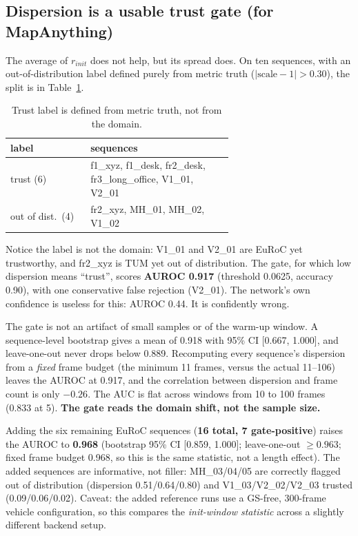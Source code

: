\subsection{Dispersion is a usable trust gate (for MapAnything)}
\label{sec:gate}

The average of $r_{init}$ does not help, but its spread does. On ten sequences,
with an out-of-distribution label defined purely from metric truth
($|\mathrm{scale}-1|>0.30$), the split is in Table~\ref{tab:label}.

\begin{table}[t]
\centering
\caption{Trust label is defined from metric truth, not from the domain.}
\label{tab:label}
\small
\setlength{\tabcolsep}{4pt}
\begin{tabular}{@{}lp{0.64\linewidth}@{}}
\toprule
label & sequences \\
\midrule
trust (6) & f1\_xyz, f1\_desk, fr2\_desk, fr3\_long\_office, V1\_01, V2\_01 \\
out of dist.\ (4) & fr2\_xyz, MH\_01, MH\_02, V1\_02 \\
\bottomrule
\end{tabular}
\end{table}

Notice the label is not the domain: V1\_01 and V2\_01 are EuRoC yet
trustworthy, and fr2\_xyz is TUM yet out of distribution. The gate, for which low
dispersion means ``trust'', scores \textbf{AUROC 0.917} (threshold 0.0625,
accuracy 0.90), with one conservative false rejection (V2\_01). The network's own
confidence is useless for this: AUROC 0.44. It is confidently wrong.

The gate is not an artifact of small samples or of the warm-up window. A
sequence-level bootstrap gives a mean of 0.918 with 95\% CI [0.667, 1.000], and
leave-one-out never drops below 0.889. Recomputing every sequence's dispersion
from a \emph{fixed} frame budget (the minimum 11 frames, versus the actual
11--106) leaves the AUROC at 0.917, and the correlation between dispersion and
frame count is only $-0.26$. The AUC is flat across windows from 10 to 100 frames
(0.833 at 5). \textbf{The gate reads the domain shift, not the sample size.}

Adding the six remaining EuRoC sequences (\textbf{16 total, 7 gate-positive})
raises the AUROC to \textbf{0.968} (bootstrap 95\% CI [0.859, 1.000];
leave-one-out $\ge0.963$; fixed frame budget 0.968, so this is the same
statistic, not a length effect). The added sequences are informative, not filler:
MH\_03/04/05 are correctly flagged out of distribution (dispersion 0.51/0.64/0.80)
and V1\_03/V2\_02/V2\_03 trusted (0.09/0.06/0.02). Caveat: the added reference
runs use a GS-free, 300-frame vehicle configuration, so this compares the
\emph{init-window statistic} across a slightly different backend setup.

